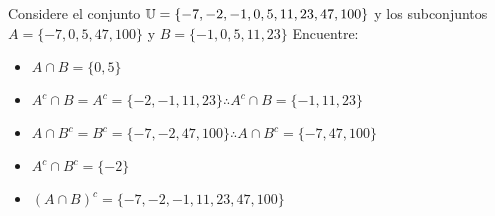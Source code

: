 \section{}
Considere el conjunto $\mathbb{U} = \{ -7, -2, -1, 0, 5, 11, 23, 47, 100\}$ y los subconjuntos $A = \{-7, 0, 5, 47, 100\}$ y $B= \{-1, 0, 5, 11, 23\}$ Encuentre:
\begin{itemize}
	\item $A \cap B = \{0, 5\}$
	\item $A^c \cap B = A^c = \{-2, -1, 11, 23\} \therefore A^c \cap B = \{-1, 11, 23\}$
	\item $A \cap B ^c = B^c = \{-7, -2, 47, 100\} \therefore A \cap B^c = \{-7, 47, 100\}$
	\item $A^c \cap B^c = \{-2\}$
	\item $(A \cap B)^c = \{-7, -2, -1, 11, 23, 47, 100\}$
\end{itemize}